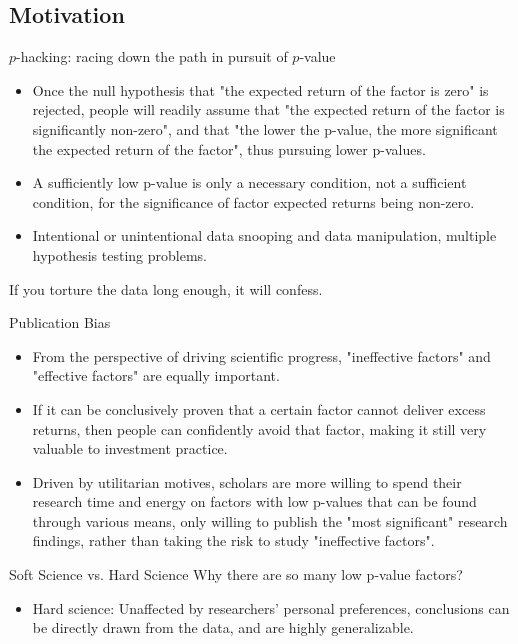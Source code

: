 \documentclass[UTF8, 16pt]{beamer}
\begin{document}
\begin{CJK*}{UTF8}{gbsn}
\section{Motivation}
\begin{frame}{$p$-hacking: racing down the path in pursuit of $p$-value}
	\begin{itemize}
		\item Once the null hypothesis that "the expected return of the factor is zero" is rejected, people will readily assume that "the expected return of the factor is significantly non-zero", and that "the lower the p-value, the more significant the expected return of the factor", thus pursuing lower p-values.
		\item A sufficiently low p-value is only a necessary condition, not a sufficient condition, for the significance of factor expected returns being non-zero.
		\item Intentional or unintentional data snooping and data manipulation, multiple hypothesis testing problems.
	\end{itemize}
	\begin{center}
		If you torture the data long enough, it will confess.
	\end{center}
\end{frame}
\begin{frame}{Publication Bias}
	\begin{itemize}
		\item From the perspective of driving scientific progress, "ineffective factors" and "effective factors" are equally important.
		\item If it can be conclusively proven that a certain factor cannot deliver excess returns, then people can confidently avoid that factor, making it still very valuable to investment practice.
		\item Driven by utilitarian motives, scholars are more willing to spend their research time and energy on factors with low p-values that can be found through various means, only willing to publish the "most significant" research findings, rather than taking the risk to study "ineffective factors".
	\end{itemize}
\end{frame}
\begin{frame}{Soft Science vs. Hard Science}
	Why there are so many low p-value factors?
	\begin{itemize}
		\item Hard science: Unaffected by researchers' personal preferences, conclusions can be directly drawn from the data, and are highly generalizable.

\end{itemize}
\end{frame}
\end{CJK*}
\end{document}
